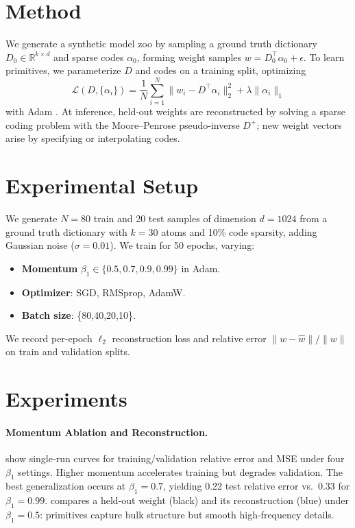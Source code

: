 \documentclass{article}
\begin{document}
\section{Method}
We generate a synthetic model zoo by sampling a ground truth dictionary $D_0\in\mathbb R^{k\times d}$ and sparse codes $\alpha_0$, forming weight samples $w=D_0^\top\alpha_0 + \epsilon$.  To learn primitives, we parameterize $D$ and codes on a training split, optimizing
\[
  \mathcal L(D,\{\alpha_i\}) = \frac1N\sum_{i=1}^N\|w_i - D^\top\alpha_i\|_2^2 + \lambda\|\alpha_i\|_1
\]
with Adam \citep{kingma2014adamam}.  At inference, held‐out weights are reconstructed by solving a sparse coding problem with the Moore–Penrose pseudo‐inverse $D^+$; new weight vectors arise by specifying or interpolating codes.

\section{Experimental Setup}
We generate $N=80$ train and 20 test samples of dimension $d=1024$ from a ground truth dictionary with $k=30$ atoms and 10\% code sparsity, adding Gaussian noise ($\sigma=0.01$).  We train for 50 epochs, varying:
\begin{itemize}
  \item \textbf{Momentum} $\beta_1\in\{0.5,0.7,0.9,0.99\}$ in Adam.
  \item \textbf{Optimizer}: SGD, RMSprop, AdamW.
  \item \textbf{Batch size}: \{80,40,20,10\}.
\end{itemize}
We record per-epoch $\ell_2$ reconstruction loss and relative error $\|w-\hat w\|/\|w\|$ on train and validation splits.

\section{Experiments}
\paragraph{Momentum Ablation and Reconstruction.}
 show single‐run curves for training/validation relative error and MSE under four $\beta_1$ settings.  Higher momentum accelerates training but degrades validation.  The best generalization occurs at $\beta_1=0.7$, yielding 0.22 test relative error vs.\ 0.33 for $\beta_1=0.99$.   compares a held‐out weight (black) and its reconstruction (blue) under $\beta_1=0.5$: primitives capture bulk structure but smooth high‐frequency details.
\end{document}
